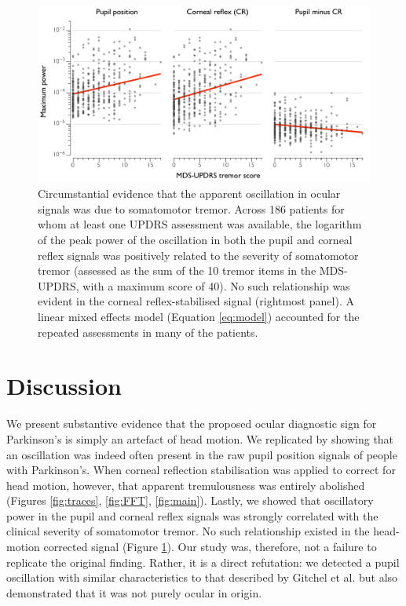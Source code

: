 \documentclass[jou,a4paper]{apa6}
\begin{document}
\begin{figure}[htbp]
\begin{center}
\includegraphics {Figures/Figure_5_UPDRS_correlation}
\caption{Circumstantial evidence that the apparent oscillation in ocular signals was due to somatomotor tremor. Across 186 patients for whom at least one UPDRS assessment was available, the logarithm of the peak power of the oscillation in both the pupil and corneal reflex signals was positively related to the severity of somatomotor tremor (assessed as the sum of the 10 tremor items in the MDS-UPDRS, with a maximum score of 40). No such relationship was evident in the corneal reflex-stabilised signal (rightmost panel). A linear mixed effects model (Equation \ref{eq:model}) accounted for the repeated assessments in many of the patients.
}
\label{fig:UPDRS}
\end{center}
\end{figure}

\section{Discussion}
We present substantive evidence that the proposed ocular diagnostic sign for Parkinson's is simply an artefact of head motion. We replicated \citet{Gitchel2012Pervasive-ocula} by showing that an oscillation was indeed often present in the raw pupil position signals of people with Parkinson's. When corneal reflection stabilisation was applied to correct for head motion, however, that apparent tremulousness was entirely abolished (Figures \ref{fig:traces}, \ref{fig:FFT}, \ref{fig:main}). Lastly, we showed that oscillatory power in the pupil and corneal reflex signals was strongly correlated with the clinical severity of somatomotor tremor. No such relationship existed in the head-motion corrected signal (Figure \ref{fig:UPDRS}). Our study was, therefore, not a failure to replicate the original finding. Rather, it is a direct refutation: we detected a pupil oscillation with similar characteristics to that described by Gitchel et al. but also demonstrated that it was not purely ocular in origin.
\end{document}
